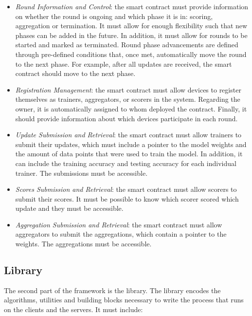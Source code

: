 \begin{itemize}
    \item \textit{Round Information and Control}: the smart contract must provide information on whether the round is ongoing and which phase it is in: scoring, aggregation or termination. It must allow for enough flexibility such that new phases can be added in the future. In addition, it must allow for rounds to be started and marked as terminated. Round phase advancements are defined through pre-defined conditions that, once met, automatically move the round to the next phase. For example, after all updates are received, the smart contract should move to the next phase.
    
    \item \textit{Registration Management}: the smart contract must allow devices to register themselves as trainers, aggregators, or scorers in the system. Regarding the owner, it is automatically assigned to whom deployed the contract. Finally, it should provide information about which devices participate in each round.
    
    \item \textit{Update Submission and Retrieval}: the smart contract must allow trainers to submit their updates, which must include a pointer to the model weights and the amount of data points that were used to train the model. In addition, it can include the training accuracy and testing accuracy for each individual trainer. The submissions must be accessible.
    
    \item \textit{Scores Submission and Retrieval}: the smart contract must allow scorers to submit their scores. It must be possible to know which scorer scored which update and they must be accessible.
    
    \item \textit{Aggregation Submission and Retrieval}: the smart contract must allow aggregators to submit the aggregations, which contain a pointer to the weights. The aggregations must be accessible.
\end{itemize}

\subsection{Library}\label{meth:library}

The second part of the framework is the library. The library encodes the algorithms, utilities and building blocks necessary to write the process that runs on the clients and the servers. It must include:

